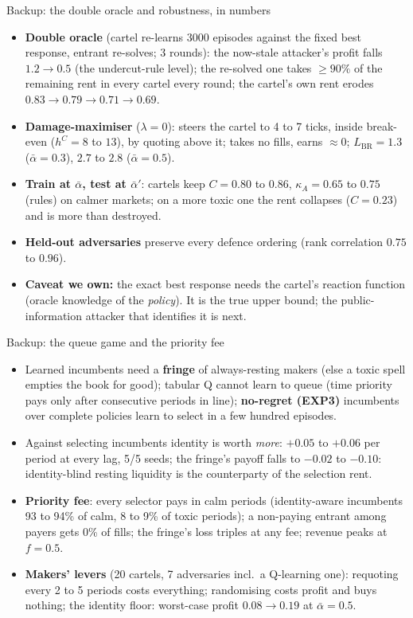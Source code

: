 \documentclass[aspectratio=169,9pt]{beamer}
\newcommand{\LBR}{L_{\mathrm{BR}}}
\begin{document}
\begin{frame}{Backup: the double oracle and robustness, in numbers}
\small
\begin{itemize}\setlength\itemsep{3pt}
\item \textbf{Double oracle} (cartel re-learns 3000 episodes against the fixed best response, entrant re-solves; 3 rounds): the now-stale attacker's profit falls $1.2\to0.5$ (the undercut-rule level); the re-solved one takes $\ge90\%$ of the remaining rent in every cartel every round; the cartel's own rent erodes $0.83\to0.79\to0.71\to0.69$.
\item \textbf{Damage-maximiser} ($\lambda=0$): steers the cartel to 4 to 7 ticks, inside break-even ($h^C=8$ to $13$), by quoting above it; takes no fills, earns $\approx0$; $\LBR=1.3$ ($\bar\alpha=0.3$), $2.7$ to $2.8$ ($\bar\alpha=0.5$).
\item \textbf{Train at $\bar\alpha$, test at $\bar\alpha'$}: cartels keep $C=0.80$ to $0.86$, $\kappa_A=0.65$ to $0.75$ (rules) on calmer markets; on a more toxic one the rent collapses ($C=0.23$) and is more than destroyed.
\item \textbf{Held-out adversaries} preserve every defence ordering (rank correlation $0.75$ to $0.96$).
\item \textbf{Caveat we own:} the exact best response needs the cartel's reaction function (oracle knowledge of the \emph{policy}). It is the true upper bound; the public-information attacker that identifies it is next.
\end{itemize}
\end{frame}

\begin{frame}{Backup: the queue game and the priority fee}
\small
\begin{itemize}\setlength\itemsep{3pt}
\item Learned incumbents need a \textbf{fringe} of always-resting makers (else a toxic spell empties the book for good); tabular Q cannot learn to queue (time priority pays only after consecutive periods in line); \textbf{no-regret (EXP3)} incumbents over complete policies learn to select in a few hundred episodes.
\item Against selecting incumbents identity is worth \emph{more}: $+0.05$ to $+0.06$ per period at every lag, 5/5 seeds; the fringe's payoff falls to $-0.02$ to $-0.10$: identity-blind resting liquidity is the counterparty of the selection rent.
\item \textbf{Priority fee}: every selector pays in calm periods (identity-aware incumbents 93 to 94\% of calm, 8 to 9\% of toxic periods); a non-paying entrant among payers gets 0\% of fills; the fringe's loss triples at any fee; revenue peaks at $f=0.5$.
\item \textbf{Makers' levers} (20 cartels, 7 adversaries incl.\ a Q-learning one): requoting every 2 to 5 periods costs everything; randomising costs profit and buys nothing; the identity floor: worst-case profit $0.08\to0.19$ at $\bar\alpha=0.5$.
\end{itemize}
\end{frame}
\end{document}
